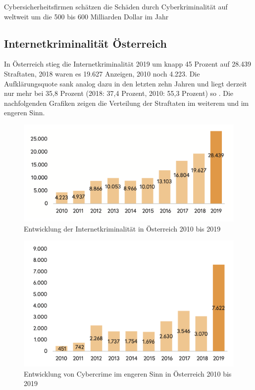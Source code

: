 Cybersicherheitsfirmen schätzen die Schäden durch Cyberkriminalität auf weltweit um die  500 bis 600 Milliarden Dollar im Jahr

\subsection{Internetkriminalität Österreich}
\label{section:cyber_criminality_austria}

In Österreich stieg die Internetkriminalität 2019 um knapp 45 Prozent auf 28.439 Straftaten, 2018 waren es 19.627 Anzeigen, 2010 noch 4.223. Die Aufklärungsquote sank analog dazu in den letzten zehn Jahren und liegt derzeit nur mehr bei 35,8 Prozent (2018: 37,4 Prozent, 2010: 55,3 Prozent) so \textcite[16-18]{bundeskriminalamt2020}. Die nachfolgenden Grafiken zeigen die Verteilung der Straftaten im weiterem und im engeren Sinn.

\begin{figure}[ht]
	\centering
	\includegraphics[width=1\linewidth]{images/bmi/Entwicklung_austria-2009-2019.png}
	\caption[Entwicklung der Internetkriminalität in Österreich 2010 bis 2019]
	{Entwicklung der Internetkriminalität in Österreich 2010 bis 2019 \autocite[16]{bundeskriminalamt2020}}
\end{figure}

\begin{figure}[ht]
	\centering
	\includegraphics[width=1\linewidth]{images/bmi/Entwicklung_cybercrime_austria-2009-2019.png}
	\caption[Entwicklung von Cybercrime im engeren Sinn in Österreich 2010 bis 2019]
	{Entwicklung von Cybercrime im engeren Sinn in Österreich 2010 bis 2019 \autocite[17]{bundeskriminalamt2020}}
\end{figure}

